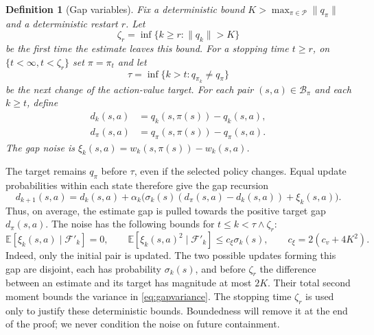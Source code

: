 \documentclass[twoside,11pt]{article}
\newtheorem{definition}[definition]{Definition}
\DeclareRobustCommand{\reviewbarstart}{%
  \ifhmode %
    \vadjust{\vbox to 0pt{%
      \vskip-\ht\strutbox %
      \vskip-\dp\strutbox %
      \cbstart[\changebarwidth] %
      \vss %
    }}%
  \else %
    \cbstart[\changebarwidth]%
  \fi %
} %
\providecommand{\DIFadd}[1]{#1} %
\providecommand{\DIFaddbegin}{\reviewbarstart} %
\providecommand{\DIFaddend}{\protect\cbend} %
\def\DIFadd#1{#1}%
\def\DIFaddbegin{}%
\def\DIFaddend{}%
\begin{document}
 \begin{definition}[Gap variables]
\label{def: gap variables}
 \DIFaddbegin \DIFadd{Fix a deterministic bound $K>\max_{\pi\in\mathcal P}\|q_\pi\|$ and a deterministic restart $r$. Let
}\[
\DIFadd{\zeta_r=\inf\{k\ge r:\|q_k\|>K\}
}\]
\DIFadd{be the first time the estimate leaves this bound.
For a stopping time $t\ge r$, on $\{t<\infty,t<\zeta_r\}$ set $\pi=\pi_t$ and let
}\[
\DIFadd{\tau=\inf\{k>t:q_{\pi_k}\ne q_\pi\}
}\]\DIFaddend 
 \DIFaddbegin \DIFadd{be the next change of the action-value target.
For }\DIFaddend each  \DIFaddbegin \DIFadd{pair $(s,a)\in\mathcal B_\pi$ and each $k\ge t$, define
}\begin{align}
\DIFadd{\label{eq:gaps}
d_k(s,a)}&\DIFadd{=q_k(s,\pi(s))-q_k(s,a),}\\
\DIFadd{d_\pi(s,a)}&\DIFadd{=q_\pi(s,\pi(s))-q_\pi(s,a).
}\end{align}\DIFaddend 
 \DIFaddbegin \DIFadd{The gap noise is $\xi_k(s,a)=w_k(s,\pi(s))-w_k(s,a)$.
}\DIFaddend \end{definition}

 \DIFaddbegin \DIFadd{The target remains $q_\pi$ before $\tau$, even if the selected policy changes. Equal update probabilities within each state therefore give the gap recursion
}\begin{equation}
\DIFadd{\label{eq:gapdrift}
d_{k+1}(s,a)=d_k(s,a)+\alpha_k\big(\sigma_k(s)(d_\pi(s,a)-d_k(s,a))+\xi_k(s,a)\big).
}\end{equation}\DIFaddend 
 \DIFaddbegin \DIFadd{Thus, on average, the estimate gap is pulled towards the positive target gap $d_\pi(s,a)$. The noise has the following bounds for $t\le k<\tau\wedge\zeta_r$:
}\begin{equation}
\DIFadd{\label{eq:gapvariance}
\mathbb E}[\DIFadd{\xi_k(s,a)\mid\mathcal F'_k}]\DIFadd{=0,
\qquad
\mathbb E}[\DIFadd{\xi_k(s,a)^2\mid\mathcal F'_k}]\DIFadd{\le c_\xi\sigma_k(s),
\qquad c_\xi=2(c_v+4K^2).
}\end{equation}\DIFaddend 
 \DIFaddbegin \DIFadd{Indeed, only the initial pair is updated. The two possible updates forming this gap are disjoint, each has probability $\sigma_k(s)$, and before $\zeta_r$ the difference between an estimate and its target has magnitude at most $2K$. Their total second moment bounds the variance in \eqref{eq:gapvariance}.
The stopping time $\zeta_r$ is used only to justify these deterministic bounds. Boundedness will remove it at the end of the proof; we never condition the noise on future containment.
}\DIFaddend 
\end{document}
